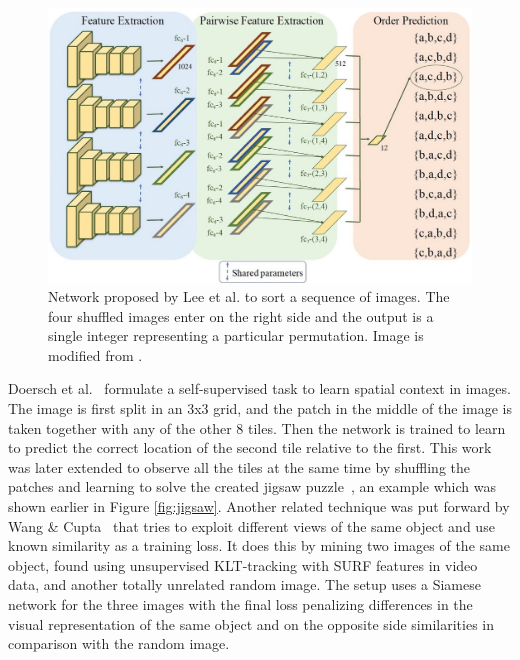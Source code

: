 \begin{figure}[t]
\centering
\includegraphics[width=\textwidth]{images/sorting_sequences.jpg}
\caption{Network proposed by Lee et al.\cite{lee2017} to sort a sequence of images. The four shuffled images enter on the right side and the output is a single integer representing a particular permutation. Image is modified from \cite{lee2017}.}
\label{fig:sorting_sequence}
\end{figure}

Doersch et al.~\cite{doersch2015} formulate a self-supervised task to learn spatial context in images. The image is first split in an 3x3 grid, and the patch in the middle of the image is taken together with any of the other 8 tiles. Then the network is trained to learn to predict the correct location of the second tile relative to the first. This work was later extended to observe all the tiles at the same time by shuffling the patches and learning to solve the created jigsaw puzzle~\cite{noroozi2016}, an example which was shown earlier in Figure \ref{fig:jigsaw}. Another related technique was put forward by Wang \& Cupta~\cite{wang2015} that tries to exploit different views of the same object and use known similarity as a training loss. It does this by mining two images of the same object, found using unsupervised KLT-tracking with SURF features in video data, and another totally unrelated random image. The setup uses a Siamese network for the three images with the final loss penalizing differences in the visual representation of the same object and on the opposite side similarities in comparison with the random image.

